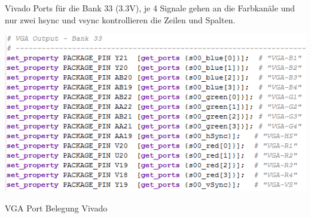 Vivado Ports für die Bank 33 (3.3V), je 4 Signale gehen an die Farbkanäle und nur zwei hsync und vsync kontrollieren 
die Zeilen und Spalten.\\

\begin{minipage}{\textwidth}
    \begin{center}
        \includegraphics[scale=0.6]{img/ports_a1.png} 
    \end{center}
\end{minipage}
\begin{center}
VGA Port Belegung Vivado
\end{center}


